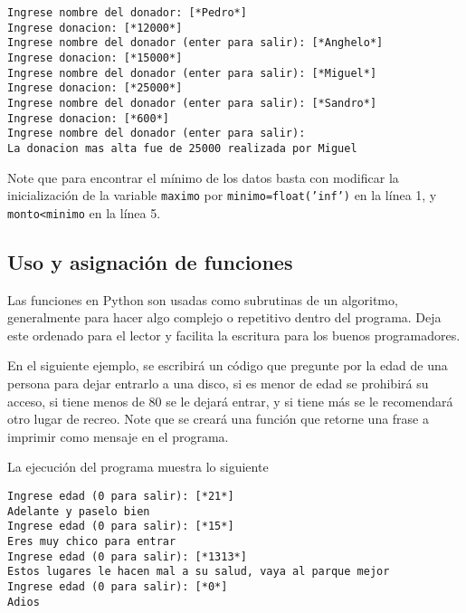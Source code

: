 \begin{lstlisting}[style=consola]
Ingrese nombre del donador: [*Pedro*]
Ingrese donacion: [*12000*]
Ingrese nombre del donador (enter para salir): [*Anghelo*]
Ingrese donacion: [*15000*]
Ingrese nombre del donador (enter para salir): [*Miguel*]
Ingrese donacion: [*25000*]
Ingrese nombre del donador (enter para salir): [*Sandro*]
Ingrese donacion: [*600*]
Ingrese nombre del donador (enter para salir): 
La donacion mas alta fue de 25000 realizada por Miguel
\end{lstlisting}

Note que para encontrar el mínimo de los datos basta con modificar la inicialización de la variable \texttt{maximo} por \texttt{minimo=float('inf')} en la línea 1, y \texttt{monto<minimo} en la línea 5.

\subsection{Uso y asignación de funciones}
Las funciones en Python son usadas como subrutinas de un algoritmo, generalmente para hacer algo complejo o repetitivo dentro del programa. Deja este ordenado para el lector y facilita la escritura para los buenos programadores.

En el siguiente ejemplo, se escribirá un código que pregunte por la edad de una persona para dejar entrarlo a una disco, si es menor de edad se prohibirá su acceso, si tiene menos de 80 se le dejará entrar, y si tiene más se le recomendará otro lugar de recreo. Note que se creará una función que retorne una frase a imprimir como mensaje en el programa.



La ejecución del programa muestra lo siguiente
\begin{lstlisting}[style=consola]
Ingrese edad (0 para salir): [*21*]
Adelante y paselo bien
Ingrese edad (0 para salir): [*15*]
Eres muy chico para entrar
Ingrese edad (0 para salir): [*1313*]
Estos lugares le hacen mal a su salud, vaya al parque mejor
Ingrese edad (0 para salir): [*0*]
Adios
\end{lstlisting}

